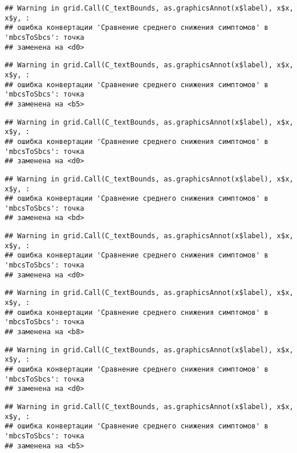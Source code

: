 \documentclass[
]{article}
\begin{document}
\begin{verbatim}
## Warning in grid.Call(C_textBounds, as.graphicsAnnot(x$label), x$x, x$y, :
## ошибка конвертации 'Сравнение среднего снижения симптомов' в 'mbcsToSbcs': точка
## заменена на <d0>
\end{verbatim}

\begin{verbatim}
## Warning in grid.Call(C_textBounds, as.graphicsAnnot(x$label), x$x, x$y, :
## ошибка конвертации 'Сравнение среднего снижения симптомов' в 'mbcsToSbcs': точка
## заменена на <b5>
\end{verbatim}

\begin{verbatim}
## Warning in grid.Call(C_textBounds, as.graphicsAnnot(x$label), x$x, x$y, :
## ошибка конвертации 'Сравнение среднего снижения симптомов' в 'mbcsToSbcs': точка
## заменена на <d0>
\end{verbatim}

\begin{verbatim}
## Warning in grid.Call(C_textBounds, as.graphicsAnnot(x$label), x$x, x$y, :
## ошибка конвертации 'Сравнение среднего снижения симптомов' в 'mbcsToSbcs': точка
## заменена на <bd>
\end{verbatim}

\begin{verbatim}
## Warning in grid.Call(C_textBounds, as.graphicsAnnot(x$label), x$x, x$y, :
## ошибка конвертации 'Сравнение среднего снижения симптомов' в 'mbcsToSbcs': точка
## заменена на <d0>
\end{verbatim}

\begin{verbatim}
## Warning in grid.Call(C_textBounds, as.graphicsAnnot(x$label), x$x, x$y, :
## ошибка конвертации 'Сравнение среднего снижения симптомов' в 'mbcsToSbcs': точка
## заменена на <b8>
\end{verbatim}

\begin{verbatim}
## Warning in grid.Call(C_textBounds, as.graphicsAnnot(x$label), x$x, x$y, :
## ошибка конвертации 'Сравнение среднего снижения симптомов' в 'mbcsToSbcs': точка
## заменена на <d0>
\end{verbatim}

\begin{verbatim}
## Warning in grid.Call(C_textBounds, as.graphicsAnnot(x$label), x$x, x$y, :
## ошибка конвертации 'Сравнение среднего снижения симптомов' в 'mbcsToSbcs': точка
## заменена на <b5>
\end{verbatim}
\end{document}
